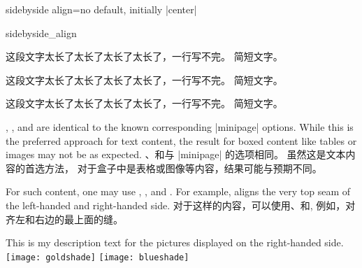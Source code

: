 \begin{docTcbKey}[][doc updated=2015-02-06]{sidebyside align}{=}{no default, initially |center|}
\begin{exdispExample}{sidebyside_align}

\begin{tcolorbox}[adjusted title=center,sidebyside align=center]
这段文字太长了太长了太长了太长了，一行写不完。
\tcblower
简短文字。
\end{tcolorbox}\hfill
\begin{tcolorbox}[adjusted title=top,sidebyside align=top]
这段文字太长了太长了太长了太长了，一行写不完。
\tcblower
简短文字。
\end{tcolorbox}\hfill
\begin{tcolorbox}[adjusted title=bottom,sidebyside align=bottom]
这段文字太长了太长了太长了太长了，一行写不完。
\tcblower
简短文字。
\end{tcolorbox}
\end{exdispExample}


\begin{stripedbox}
, , and  are identical
to the known corresponding |minipage| options.
While this is the preferred approach for text content, the result for
boxed content like tables or images may not be as expected.
\tcblower
{}、和与 |minipage| 的选项相同。%
虽然这是文本内容的首选方法，%
对于盒子中是表格或图像等内容，结果可能与预期不同。
\end{stripedbox}

\begin{stripedbox}
For such content, one may use , ,
and . For example,  aligns
the very top seam of the left-handed and right-handed side.
\tcblower
对于这样的内容，可以使用、和,
例如，对齐左和右边的最上面的缝。
\end{stripedbox}

\begin{dispExample}

\begin{tcolorbox}[adjusted title=center seam,sidebyside align=center seam]
This is my description text for the pictures displayed on the right-handed side.
\tcblower
\texttt{[image: goldshade]}%
\texttt{[image: blueshade]}
\end{tcolorbox}


\end{dispExample}
\end{docTcbKey}
